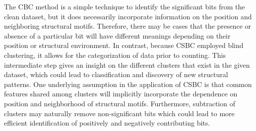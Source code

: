 The CBC method is a simple technique to identify the significant bits from the clean dataset, but it does necessarily incorporate information on the position and neighboring structural motifs. Therefore, there may be cases that the presence or absence of a particular bit will have different meanings depending on their position or structural environment. In contrast, because CSBC employed blind clustering, it allows for the categorization of data prior to counting. This intermediate step gives an insight on the different clusters that exist in the given dataset, which could lead to classification and discovery of new structural patterns. One underlying assumption in the application of CSBC is that common features shared among clusters will implicitly incorporate the dependence on position and neighborhood of structural motifs. Furthermore, subtraction of clusters  may naturally remove non-significant bits which could lead to more efficient identification of positively and negatively contributing bits. 


